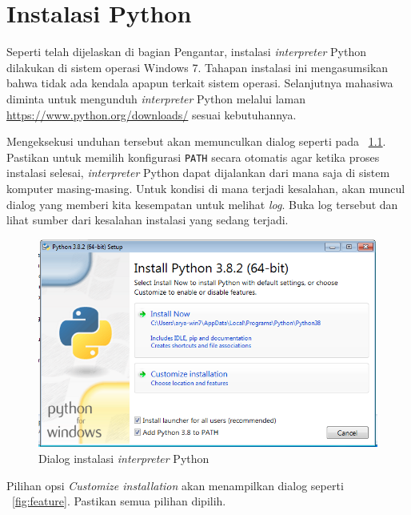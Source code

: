 \chapter{Instalasi Python}
Seperti telah dijelaskan di bagian Pengantar, instalasi \textit{interpreter} Python dilakukan di sistem operasi Windows 7. Tahapan instalasi ini mengasumsikan bahwa tidak ada kendala apapun terkait sistem operasi. Selanjutnya mahasiwa diminta untuk mengunduh \textit{interpreter} Python melalui laman \url{https://www.python.org/downloads/} sesuai kebutuhannya. 

Mengeksekusi unduhan tersebut akan memunculkan dialog seperti pada \figurename~\ref{fig:install1}. Pastikan untuk memilih konfigurasi \texttt{PATH} secara otomatis agar ketika proses instalasi selesai, \textit{interpreter} Python dapat dijalankan dari mana saja di sistem komputer masing-masing. Untuk kondisi di mana terjadi kesalahan, akan muncul dialog yang memberi kita kesempatan untuk melihat \textit{log}. Buka log tersebut dan lihat sumber dari kesalahan instalasi yang sedang terjadi.

\begin{figure}[h!]
   \begin{center}
     \includegraphics[scale=.5]{pics/installPython1.png}
     \caption{Dialog instalasi \textit{interpreter} Python}
     \label{fig:install1}
   \end{center}
 \end{figure} 

Pilihan opsi \textit{Customize installation} akan menampilkan dialog seperti \figurename~\ref{fig:feature}. Pastikan semua pilihan dipilih.

